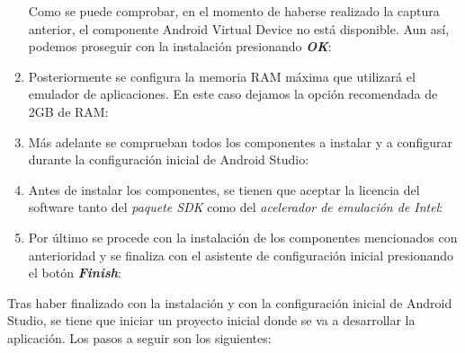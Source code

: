 \begin{enumerate}
        Como se puede comprobar, en el momento de haberse realizado la captura anterior, el componente Android Virtual Device no está disponible. Aun así, podemos proseguir con la instalación presionando \textbf{\textit{OK}}:
        \item Posteriormente se configura la memoria RAM máxima que utilizará el emulador de aplicaciones. En este caso dejamos la opción recomendada de 2GB de RAM:
        \item Más adelante se comprueban todos los componentes a instalar y a configurar durante la configuración inicial de Android Studio:
        \item Antes de instalar los componentes, se tienen que aceptar la licencia del software tanto del \textit{paquete SDK} como del \textit{acelerador de emulación de Intel}:
        \item Por último se procede con la instalación de los componentes mencionados con anterioridad y se finaliza con el asistente de configuración inicial presionando el botón \textit{\textbf{Finish}}:
    \end{enumerate}
    Tras haber finalizado con la instalación y con la configuración inicial de Android Studio, se tiene que iniciar un proyecto inicial donde se va a desarrollar la aplicación. Los pasos a seguir son los siguientes:

